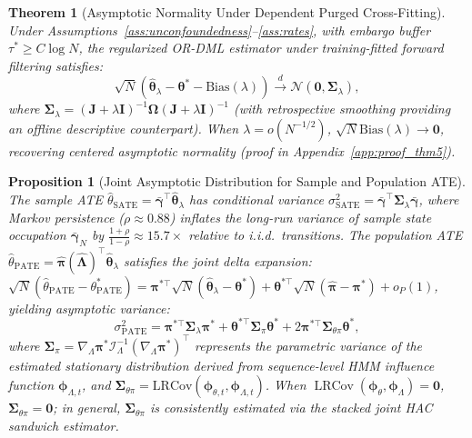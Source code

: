 \documentclass[twoside]{article}
\newtheorem{theorem}{Theorem}
\newtheorem{proposition}{Proposition}
\theoremstyle{definition}
\begin{document}
\begin{theorem}[Asymptotic Normality Under Dependent Purged Cross-Fitting]
\label{thm:asymptotics}
Under Assumptions~\ref{ass:unconfoundedness}--\ref{ass:rates}, with embargo buffer $\tau^* \ge C \log N$, the regularized OR-DML estimator under training-fitted forward filtering satisfies:
\begin{equation}
    \sqrt{N}\left( \hat{\boldsymbol{\theta}}_\lambda - \boldsymbol{\theta}^* - \mathrm{Bias}(\lambda) \right) \xrightarrow{d} \mathcal{N}\left(\mathbf{0}, \boldsymbol{\Sigma}_\lambda\right),
\end{equation}
where $\boldsymbol{\Sigma}_\lambda = (\boldsymbol{J} + \lambda \boldsymbol{I})^{-1} \boldsymbol{\Omega} (\boldsymbol{J} + \lambda \boldsymbol{I})^{-1}$ (with retrospective smoothing providing an offline descriptive counterpart). When $\lambda = o(N^{-1/2})$, $\sqrt{N}\mathrm{Bias}(\lambda) \to \mathbf{0}$, recovering centered asymptotic normality (proof in Appendix~\ref{app:proof_thm5}).
\end{theorem}

\begin{proposition}[Joint Asymptotic Distribution for Sample and Population ATE]
\label{prop:variance}
The sample ATE $\hat{\theta}_{\mathrm{SATE}} = \bar{\boldsymbol{\gamma}}^\top \hat{\boldsymbol{\theta}}_\lambda$ has conditional variance $\sigma_{\mathrm{SATE}}^2 = \bar{\boldsymbol{\gamma}}^\top \boldsymbol{\Sigma}_\lambda \bar{\boldsymbol{\gamma}}$, where Markov persistence ($\rho \approx 0.88$) inflates the long-run variance of sample state occupation $\bar{\boldsymbol{\gamma}}_N$ by $\frac{1+\rho}{1-\rho} \approx 15.7\times$ relative to i.i.d.\ transitions. The population ATE $\hat{\theta}_{\mathrm{PATE}} = \hat{\boldsymbol{\pi}}(\hat{\boldsymbol{\Lambda}})^\top \hat{\boldsymbol{\theta}}_\lambda$ satisfies the joint delta expansion: $\sqrt{N}(\hat{\theta}_{\mathrm{PATE}} - \theta_{\mathrm{PATE}}^*) = \boldsymbol{\pi}^{*\top} \sqrt{N}(\hat{\boldsymbol{\theta}}_\lambda - \boldsymbol{\theta}^*) + \boldsymbol{\theta}^{*\top} \sqrt{N}(\hat{\boldsymbol{\pi}} - \boldsymbol{\pi}^*) + o_P(1)$, yielding asymptotic variance:
\begin{equation}
    \sigma_{\mathrm{PATE}}^2 = \boldsymbol{\pi}^{*\top} \boldsymbol{\Sigma}_\lambda \boldsymbol{\pi}^* + \boldsymbol{\theta}^{*\top} \boldsymbol{\Sigma}_\pi \boldsymbol{\theta}^* + 2 \boldsymbol{\pi}^{*\top} \boldsymbol{\Sigma}_{\theta \pi} \boldsymbol{\theta}^*,
\end{equation}
where $\boldsymbol{\Sigma}_\pi = \nabla_\Lambda \boldsymbol{\pi}^* \mathcal{I}_\Lambda^{-1} (\nabla_\Lambda \boldsymbol{\pi}^*)^\top$ represents the parametric variance of the estimated stationary distribution derived from sequence-level HMM influence function $\boldsymbol{\phi}_{\Lambda, t}$, and $\boldsymbol{\Sigma}_{\theta\pi} = \mathrm{LRCov}(\boldsymbol{\phi}_{\theta, t}, \boldsymbol{\phi}_{\Lambda, t})$. When $\operatorname{LRCov}(\boldsymbol{\phi}_\theta, \boldsymbol{\phi}_\Lambda) = \mathbf{0}$, $\boldsymbol{\Sigma}_{\theta\pi} = \mathbf{0}$; in general, $\boldsymbol{\Sigma}_{\theta \pi}$ is consistently estimated via the stacked joint HAC sandwich estimator.
\end{proposition}
\end{document}
